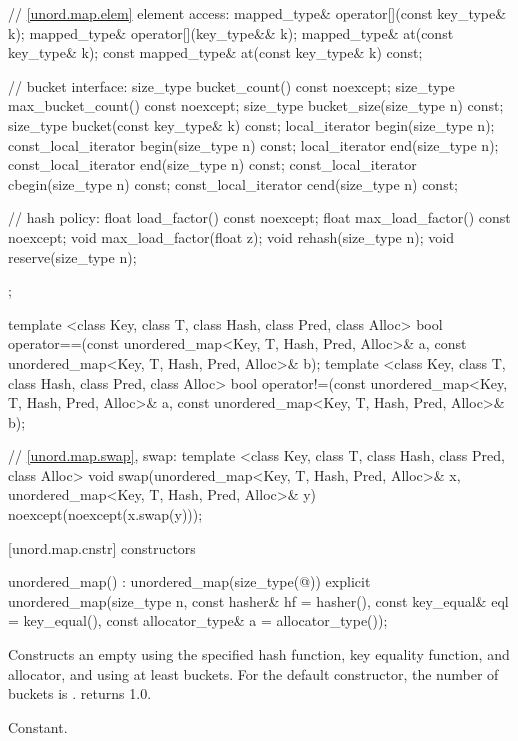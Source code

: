 \begin{codeblock}
{{    // \ref{unord.map.elem} element access:
    mapped_type& operator[](const key_type& k);
    mapped_type& operator[](key_type&& k);
    mapped_type& at(const key_type& k);
    const mapped_type& at(const key_type& k) const;

    // bucket interface:
    size_type bucket_count() const noexcept;
    size_type max_bucket_count() const noexcept;
    size_type bucket_size(size_type n) const;
    size_type bucket(const key_type& k) const;
    local_iterator begin(size_type n);
    const_local_iterator begin(size_type n) const;
    local_iterator end(size_type n);
    const_local_iterator end(size_type n) const;
    const_local_iterator cbegin(size_type n) const;
    const_local_iterator cend(size_type n) const;

    // hash policy:
    float load_factor() const noexcept;
    float max_load_factor() const noexcept;
    void max_load_factor(float z);
    void rehash(size_type n);
    void reserve(size_type n);
  };

  template <class Key, class T, class Hash, class Pred, class Alloc>
    bool operator==(const unordered_map<Key, T, Hash, Pred, Alloc>& a,
                    const unordered_map<Key, T, Hash, Pred, Alloc>& b);
  template <class Key, class T, class Hash, class Pred, class Alloc>
    bool operator!=(const unordered_map<Key, T, Hash, Pred, Alloc>& a,
                    const unordered_map<Key, T, Hash, Pred, Alloc>& b);

  // \ref{unord.map.swap}, swap:
  template <class Key, class T, class Hash, class Pred, class Alloc>
    void swap(unordered_map<Key, T, Hash, Pred, Alloc>& x,
              unordered_map<Key, T, Hash, Pred, Alloc>& y)
      noexcept(noexcept(x.swap(y)));
}
\end{codeblock}

[unord.map.cnstr]{ constructors}

%
\begin{itemdecl}
unordered_map() : unordered_map(size_type(@\seebelow@)) { }
explicit unordered_map(size_type n,
                       const hasher& hf = hasher(),
                       const key_equal& eql = key_equal(),
                       const allocator_type& a = allocator_type());
\end{itemdecl}

\begin{itemdescr}
\pnum
\effects Constructs an empty  using the
specified hash function, key equality function, and allocator, and
using at least  buckets.  For the default constructor,
the number of buckets is .
 returns 1.0.

\pnum
\complexity Constant.
\end{itemdescr}

